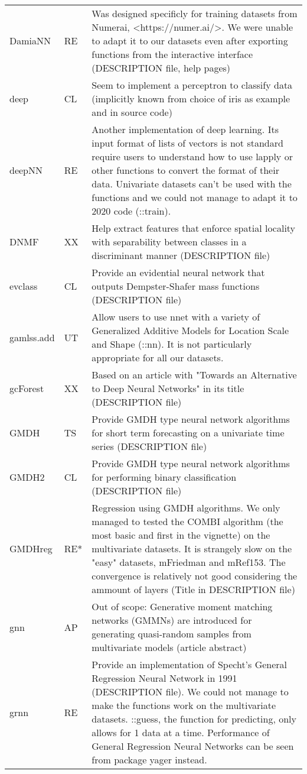 \begin{Schunk}
\begin{longtable}[t]{ll>{\raggedright\arraybackslash}p{10cm}}
DamiaNN & RE & Was designed specificly for training datasets from Numerai, <https://numer.ai/>. We were unable to adapt it to our datasets even after exporting functions from the interactive interface (DESCRIPTION file, help pages)\\
deep & CL & Seem to implement a perceptron to classify data (implicitly known from choice of iris as example and in source code)\\
deepNN & RE & Another implementation of deep learning. Its input format of lists of vectors is not standard require users to understand how to use lapply or other functions to convert the format of their data. Univariate datasets can't be used with the functions and we could not manage to adapt it to 2020 code (::train).\\
\addlinespace
DNMF & XX & Help extract features that enforce spatial locality with separability between classes in a discriminant manner (DESCRIPTION file)\\
evclass & CL & Provide an evidential neural network that outputs Dempster-Shafer mass functions (DESCRIPTION file)\\
gamlss.add & UT & Allow users to use nnet with a variety of Generalized Additive Models for Location Scale and Shape (::nn). It is not particularly appropriate for all our datasets.\\
gcForest & XX & Based on an article with "Towards an Alternative to Deep Neural Networks" in its title (DESCRIPTION file)\\
GMDH & TS & Provide GMDH type neural network algorithms for short term forecasting on a univariate time series (DESCRIPTION file)\\
\addlinespace
GMDH2 & CL & Provide GMDH type neural network algorithms for performing binary classification (DESCRIPTION file)\\
GMDHreg & RE* & Regression using GMDH algorithms. We only managed to tested the COMBI algorithm (the most basic and first in the vignette) on the multivariate datasets. It is strangely slow on the "easy" datasets, mFriedman and mRef153. The convergence is relatively not good considering the ammount of layers (Title in DESCRIPTION file)\\
gnn & AP & Out of scope: Generative moment matching networks (GMMNs) are introduced for generating quasi-random samples from multivariate models (article abstract)\\
grnn & RE & Provide an implementation of Specht's General Regression Neural Network in 1991 (DESCRIPTION file). We could not manage to make the functions work on the multivariate datasets. ::guess, the function for predicting, only allows for 1 data at a time. Performance of General Regression Neural Networks can be seen from package yager instead.\\

\end{longtable}
\end{Schunk}
